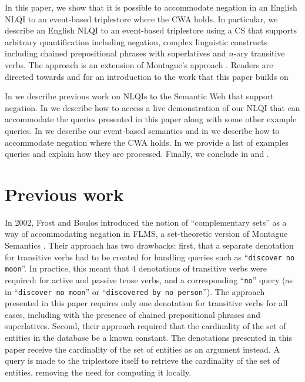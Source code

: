 \documentclass[../main.tex]{subfiles}
\begin{document}
\begin{refsection}
In this paper, we show that it is possible to accommodate negation in an English NLQI to an event-based triplestore where the CWA holds.
In particular, we describe an English NLQI to an event-based triplestore using a CS that supports arbitrary quantification including negation, complex linguistic constructs including chained prepositional phrases with superlatives and $n$-ary transitive verbs.
The approach is an extension of Montague’s approach \cite{Dowty:wall}.  Readers are
directed towards \cite{frostpeelar2019} and \cite{peelar2020webistjournal} for an introduction to the work that this paper builds on

In  we describe previous work on NLQIs to the Semantic Web that support negation.  In  we describe how to access a live demonstration of our NLQI that can accommodate the queries presented in this paper along with some other example queries.  In  we describe our event-based semantics and in  we describe how to accommodate negation where the CWA holds. In  we provide a list of examples queries and explain how they are processed.  Finally, we conclude in  and .



\section{Previous work}
\label{subsec:prevwork}

In 2002, Frost and Boulos introduced the notion of ``complementary sets'' as a way of accommodating negation in FLMS, a set-theoretic version of Montague Semantics \cite{frostboulos2002}. Their approach has two drawbacks: first, that a separate denotation for transitive verbs had to be created for handling queries such as ``\texttt{discover no moon}''.  In practice, this meant that 4 denotations of transitive verbs were required: for active and passive tense verbs, and a corresponding ``\texttt{no}'' query (as in ``\texttt{discover no moon}'' or ``\texttt{discovered by no person}'').  The approach presented in this paper requires only one denotation for transitive verbs for all cases, including with the presence of chained prepositional phrases and superlatives.  Second, their approach required that the cardinality of the set of entities in the database be a known constant.  The denotations presented in this paper receive the cardinality of the set of entities as an argument instead.  A query is made to the triplestore itself to retrieve the cardinality of the set of entities, removing the need for computing it locally.


\end{refsection}
\end{document}
